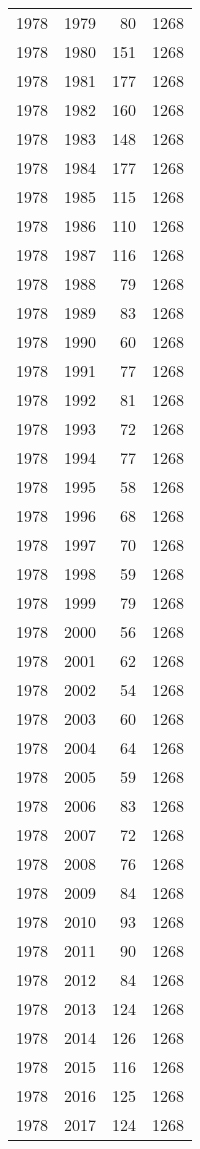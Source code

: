 \documentclass[
  10pt,
  letterpaper,
  DIV=11,
  numbers=noendperiod,
  twoside]{scrartcl}
\begin{document}
\begin{longtable}[]{@{}rrrr@{}}
1978 & 1979 & 80 & 1268 \\
1978 & 1980 & 151 & 1268 \\
1978 & 1981 & 177 & 1268 \\
1978 & 1982 & 160 & 1268 \\
1978 & 1983 & 148 & 1268 \\
1978 & 1984 & 177 & 1268 \\
1978 & 1985 & 115 & 1268 \\
1978 & 1986 & 110 & 1268 \\
1978 & 1987 & 116 & 1268 \\
1978 & 1988 & 79 & 1268 \\
1978 & 1989 & 83 & 1268 \\
1978 & 1990 & 60 & 1268 \\
1978 & 1991 & 77 & 1268 \\
1978 & 1992 & 81 & 1268 \\
1978 & 1993 & 72 & 1268 \\
1978 & 1994 & 77 & 1268 \\
1978 & 1995 & 58 & 1268 \\
1978 & 1996 & 68 & 1268 \\
1978 & 1997 & 70 & 1268 \\
1978 & 1998 & 59 & 1268 \\
1978 & 1999 & 79 & 1268 \\
1978 & 2000 & 56 & 1268 \\
1978 & 2001 & 62 & 1268 \\
1978 & 2002 & 54 & 1268 \\
1978 & 2003 & 60 & 1268 \\
1978 & 2004 & 64 & 1268 \\
1978 & 2005 & 59 & 1268 \\
1978 & 2006 & 83 & 1268 \\
1978 & 2007 & 72 & 1268 \\
1978 & 2008 & 76 & 1268 \\
1978 & 2009 & 84 & 1268 \\
1978 & 2010 & 93 & 1268 \\
1978 & 2011 & 90 & 1268 \\
1978 & 2012 & 84 & 1268 \\
1978 & 2013 & 124 & 1268 \\
1978 & 2014 & 126 & 1268 \\
1978 & 2015 & 116 & 1268 \\
1978 & 2016 & 125 & 1268 \\
1978 & 2017 & 124 & 1268 \\

\end{longtable}
\end{document}
